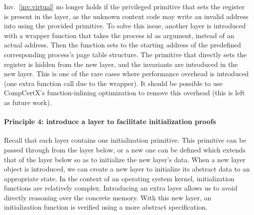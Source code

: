 Inv.~\ref{inv:virtual} no longer holds 
if the privileged primitive that sets the 
register is present in the layer, as the unknown context code may write
an invalid address into  using the provided primitive. To solve this issue, another
layer is introduced with a wrapper function that takes the process id as argument,
instead of an actual address. Then the function sets  to the
starting address of the predefined corresponding process's page table structure.
The primitive that directly sets the  register is hidden from the
new layer, and the invariants are introduced in the new layer.
This is one of the rare cases where performance overhead is introduced
(one extra function call due to the wrapper).
It should be possible to use CompCertX's function-inlining optimization
to remove this overhead (this is left as future work).


\paragraph{Principle 4: introduce a layer to facilitate initialization proofs}
Recall that each layer contains one initialization primitive.
This primitive can be
passed through from the layer below,
or a new one can be defined which extends that of the layer below
so as to initialize the new layer's data.
When a new layer object is introduced, 
we can create a new layer to initialize its abstract data to an appropriate state.
In the context of an operating system kernel, initialization functions are
relatively complex. Introducing an extra layer allows us to
avoid directly reasoning over the concrete memory. 
With this new layer, an initialization
function is verified using a more abstract specification.

